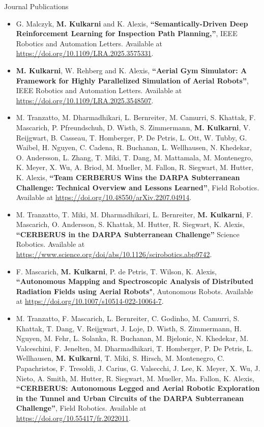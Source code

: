 \documentclass{resume} %
\begin{document}
\begin{rSection}{Journal Publications}
\begin{itemize}
    \item G. Malczyk, \textbf{M. Kulkarni} and K. Alexis, \textbf{``Semantically-Driven Deep Reinforcement Learning for Inspection Path Planning,''}, IEEE Robotics and Automation Letters. Available at \url{https://doi.org/10.1109/LRA.2025.3575331}.
    \item \textbf{M. Kulkarni}, W. Rehberg and K. Alexis, \textbf{``Aerial Gym Simulator: A Framework for Highly Parallelized Simulation of Aerial Robots''}, IEEE Robotics and Automation Letters. Available at \url{https://doi.org/10.1109/LRA.2025.3548507}.
    \item M. Tranzatto, M. Dharmadhikari, L. Bernreiter, M. Camurri, S. Khattak, F. Mascarich, P. Pfreundschuh, D. Wisth, S. Zimmermann, \textbf{M. Kulkarni}, V. Reijgwart, B. Casseau, T. Homberger, P. De Petris, L. Ott, W. Tubby, G. Waibel, H. Nguyen, C. Cadena, R. Buchanan, L. Wellhausen, N. Khedekar, O. Andersson, L. Zhang, T. Miki, T. Dang, M. Mattamala, M. Montenegro, K. Meyer, X. Wu, A. Briod, M. Mueller, M. Fallon, R. Siegwart, M. Hutter, K. Alexis, \textbf{``Team CERBERUS Wins the DARPA Subterranean Challenge: Technical Overview and Lessons Learned''}, Field Robotics. Available at \url{https://doi.org/10.48550/arXiv.2207.04914}.
    \item M. Tranzatto, T. Miki, M. Dharmadhikari, L. Bernreiter, \textbf{M. Kulkarni}, F. Mascarich, O. Andersson, S. Khattak, M. Hutter, R. Siegwart, K. Alexis, \textbf{``CERBERUS in the DARPA Subterranean Challenge''} Science Robotics. Available at \url{https://www.science.org/doi/abs/10.1126/scirobotics.abp9742}.
    \item F. Mascarich, \textbf{M. Kulkarni}, P. de Petris, T. Wilson, K. Alexis, \textbf{``Autonomous Mapping and Spectroscopic Analysis of Distributed Radiation Fields using Aerial Robots"}, Autonomous Robots. Available at \url{https://doi.org/10.1007/s10514-022-10064-7}.
    \item M. Tranzatto, F. Mascarich, L. Bernreiter, C. Godinho, M. Camurri, S. Khattak, T. Dang, V. Reijgwart, J. Loje, D. Wisth, S. Zimmermann, H. Nguyen, M. Fehr, L. Solanka, R. Buchanan, M. Bjelonic, N. Khedekar, M. Valceschini, F. Jenelten, M. Dharmadhikari, T. Homberger, P. De Petris, L. Wellhausen, \textbf{M. Kulkarni}, T. Miki, S. Hirsch, M. Montenegro, C. Papachristos, F. Tresoldi, J. Carius, G. Valsecchi, J. Lee, K. Meyer, X. Wu, J. Nieto, A. Smith, M. Hutter, R. Siegwart, M. Mueller, Ma. Fallon, K. Alexis, \textbf{``CERBERUS: Autonomous Legged and Aerial Robotic Exploration in the Tunnel and Urban Circuits of the DARPA Subterranean Challenge''}, Field Robotics. Available at \url{https://doi.org/10.55417/fr.2022011}.\\ 
\end{itemize}
\end{rSection}
\end{document}
